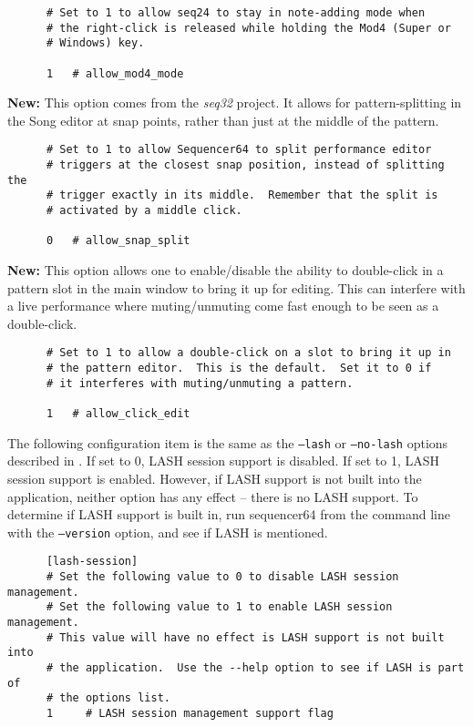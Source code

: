    \begin{verbatim}
      # Set to 1 to allow seq24 to stay in note-adding mode when
      # the right-click is released while holding the Mod4 (Super or
      # Windows) key.

      1   # allow_mod4_mode
   \end{verbatim}

   \textbf{New:}
   This option comes from the \textsl{seq32} project.  It allows for
   pattern-splitting in the Song editor at snap points, rather than just
   at the middle of the pattern.

   \begin{verbatim}
      # Set to 1 to allow Sequencer64 to split performance editor
      # triggers at the closest snap position, instead of splitting the
      # trigger exactly in its middle.  Remember that the split is
      # activated by a middle click.

      0   # allow_snap_split
   \end{verbatim}

   \textbf{New:}
   This option allows one to enable/disable the ability to double-click
   in a pattern slot in the main window to bring it up for editing.  This
   can interfere with a live performance where muting/unmuting come fast enough
   to be seen as a double-click.

   \begin{verbatim}
      # Set to 1 to allow a double-click on a slot to bring it up in
      # the pattern editor.  This is the default.  Set it to 0 if
      # it interferes with muting/unmuting a pattern.

      1   # allow_click_edit
   \end{verbatim}

   The following configuration item is the same as the
   \texttt{--lash} or \texttt{--no-lash} options described in
   .
   If set to 0, LASH session support is disabled.
   If set to 1, LASH session support is enabled.
   However, if LASH support is not built into the application, neither option
   has any effect -- there is no LASH support.  
   To determine if LASH support is built in, run sequencer64 from the command
   line with the \texttt{--version} option, and see if LASH is mentioned.

   \begin{verbatim}
      [lash-session]
      # Set the following value to 0 to disable LASH session management.
      # Set the following value to 1 to enable LASH session management.
      # This value will have no effect is LASH support is not built into
      # the application.  Use the --help option to see if LASH is part of
      # the options list.
      1     # LASH session management support flag
   \end{verbatim}

